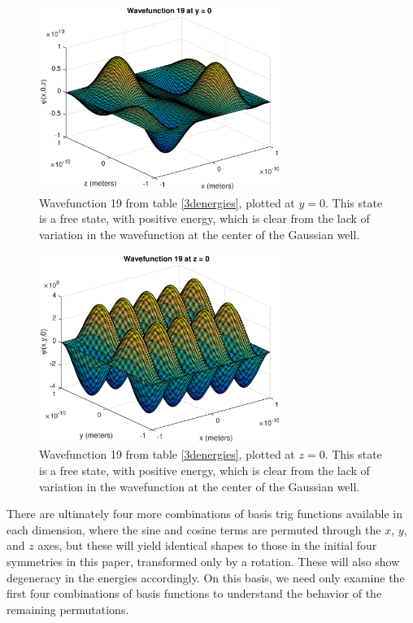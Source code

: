 \documentclass[12pt]{article}
\begin{document}
\begin{figure}
\begin{center}
\includegraphics[width=0.7\textwidth]{./pics/wfn19y0.eps}
\end{center}
\caption{\label{19y0}Wavefunction 19 from table \ref{3denergies}, plotted at $y=0$.  This state is a free state, with positive energy, which is clear from the lack of variation in the wavefunction at the center of the Gaussian well.}
\end{figure}

\begin{figure}
\begin{center}
\includegraphics[width=0.7\textwidth]{./pics/wfn19z0.eps}
\end{center}
\caption{\label{19z0}Wavefunction 19 from table \ref{3denergies}, plotted at $z=0$.  This state is a free state, with positive energy, which is clear from the lack of variation in the wavefunction at the center of the Gaussian well.}
\end{figure}

There are ultimately four more combinations of basis trig functions available in each dimension, where the sine and cosine terms are permuted through the $x$, $y$, and $z$ axes, but these will yield identical shapes to those in the initial four symmetries in this paper, transformed only by a rotation.  These will also show degeneracy in the energies accordingly.  On this basis, we need only examine the first four combinations of basis functions to understand the behavior of the remaining permutations.
\end{document}

